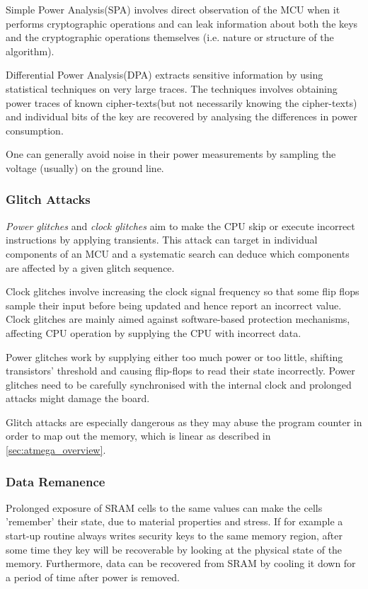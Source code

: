 \documentclass[10pt,a4paper,twocolumn]{article}
\begin{document}
	Simple Power Analysis(SPA) involves direct observation of the MCU when it performs cryptographic operations and can leak information about both the keys and the cryptographic operations themselves (i.e. nature or structure of the algorithm). 

	Differential Power Analysis(DPA) extracts sensitive information by using statistical techniques on very large traces. The techniques involves obtaining power traces of known cipher-texts(but not necessarily knowing the cipher-texts) and individual bits of the key are recovered by analysing the differences in power consumption\citep{kocher:DPA}.
	
	One can generally avoid noise in their power measurements by sampling the voltage (usually) on the ground line.
	\subsubsection{Glitch Attacks}
	\emph{Power glitches} and \emph{clock glitches} aim to make the CPU skip or execute incorrect instructions by applying transients. This attack can target in individual components of an MCU and a systematic search can deduce which components are affected by a given glitch sequence.
	
	Clock glitches involve increasing the clock signal frequency so that some flip flops sample their input before being updated and hence report an incorrect value. Clock glitches are mainly aimed against software-based protection mechanisms, affecting CPU operation by supplying the CPU with incorrect data.
	
	Power glitches work by supplying either too much power or too little, shifting transistors' threshold and causing flip-flops to read their state incorrectly. Power glitches need to be carefully synchronised with the internal clock and prolonged attacks might damage the board.
	
	Glitch attacks are especially dangerous as they may abuse the program counter in order to map out the memory, which is linear as described in \ref{sec:atmega_overview}.
	
	\subsubsection{Data Remanence}
	Prolonged exposure of SRAM cells to the same values can make the cells 'remember' their state, due to material properties and stress\citep{gutman:memory_remanence}. If for example a start-up routine always writes security keys to the same memory region, after some time they key will be recoverable by looking at the physical state of the memory. Furthermore, data can be recovered from SRAM  by cooling it down for a period of time after power is removed.
	
\end{document}
